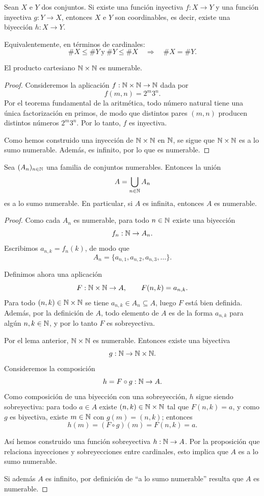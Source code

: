\begin{teo}
Sean $X$ e $Y$ dos conjuntos. Si existe una función inyectiva
$f : X \to Y$ y una función inyectiva $g : Y \to X$, entonces
$X$ e $Y$ son coordinables, es decir, existe una biyección
$h : X \to Y$.
\end{teo}

Equivalentemente, en términos de cardinales:
\[
\#X \le \#Y \ \text{y} \ \#Y \le \#X \quad \Longrightarrow \quad \#X = \#Y.
\]

\begin{lema}
El producto cartesiano $\mathbb{N} \times \mathbb{N}$ es numerable.
\end{lema}

\begin{proof}
Consideremos la aplicación $f : \mathbb{N} \times \mathbb{N} \to \mathbb{N}$ dada por
\[
f(m,n) = 2^m 3^n.
\]
Por el teorema fundamental de la aritmética, todo número natural
tiene una única factorización en primos, de modo que distintos pares
$(m,n)$ producen distintos números $2^m 3^n$. Por lo tanto, $f$ es
inyectiva.

Como hemos construido una inyección de $\mathbb{N} \times \mathbb{N}$ en $\mathbb{N}$, se sigue
que $\mathbb{N} \times \mathbb{N}$ es a lo sumo numerable. Además, es infinito, por lo
que es numerable.
\end{proof}

\begin{teo}
Sea $(A_n)_{n\in\mathbb{N}}$ una familia de conjuntos numerables.
Entonces la unión
\[
A = \bigcup_{n\in\mathbb{N}} A_n
\]
es a lo sumo numerable. En particular, si $A$ es infinita, entonces
$A$ es numerable.
\end{teo}

\begin{proof}
Como cada $A_n$ es numerable, para todo $n \in \mathbb{N}$ existe una
biyección
\[
f_n : \mathbb{N} \to A_n.
\]
Escribimos $a_{n,k} = f_n(k)$, de modo que
\[
A_n = \{a_{n,1}, a_{n,2}, a_{n,3}, \dots\}.
\]

Definimos ahora una aplicación
\[
F : \mathbb{N} \times \mathbb{N} \to A, \qquad F(n,k) = a_{n,k}.
\]
Para todo $(n,k) \in \mathbb{N}\times\mathbb{N}$ se tiene $a_{n,k} \in A_n \subseteq A$,
luego $F$ está bien definida. Además, por la definición de $A$,
todo elemento de $A$ es de la forma $a_{n,k}$ para algún $n,k \in \mathbb{N}$,
y por lo tanto $F$ es sobreyectiva.

Por el lema anterior, $\mathbb{N} \times \mathbb{N}$ es numerable. Entonces existe una
biyectiva
\[
g : \mathbb{N} \to \mathbb{N} \times \mathbb{N}.
\]
Consideremos la composición
\[
h = F \circ g : \mathbb{N} \to A.
\]
Como composición de una biyección con una sobreyección, $h$ sigue
siendo sobreyectiva: para todo $a \in A$ existe $(n,k) \in \mathbb{N} \times \mathbb{N}$
tal que $F(n,k) = a$, y como $g$ es biyectiva, existe $m \in \mathbb{N}$ con
$g(m) = (n,k)$; entonces
\[
h(m) = (F \circ g)(m) = F(n,k) = a.
\]

Así hemos construido una función sobreyectiva $h : \mathbb{N} \to A$.
Por la proposición que relaciona inyecciones y sobreyecciones entre
cardinales, esto implica que $A$ es a lo sumo numerable.

Si además $A$ es infinito, por definición de “a lo sumo numerable”
resulta que $A$ es numerable.
\end{proof}


